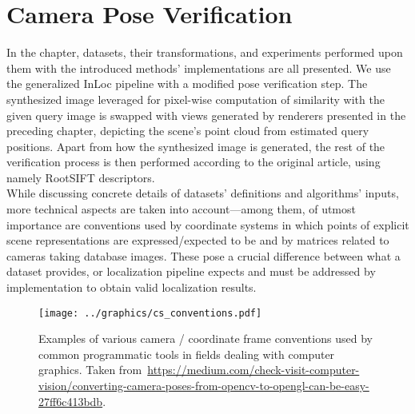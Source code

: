 \chapter{Camera Pose Verification}

In the chapter, datasets, their transformations, and experiments performed upon them with
the introduced methods' implementations are all presented. We use the generalized InLoc
pipeline with a modified pose verification step. The synthesized image leveraged for
pixel-wise computation of similarity with the given query image is swapped with views
generated by renderers presented in the preceding chapter, depicting the scene's point
cloud from estimated query positions. Apart from how the synthesized image is generated,
the rest of the verification process is then performed according to the original article,
using namely RootSIFT descriptors.\\

While discussing concrete details of datasets' definitions and algorithms' inputs, more
technical aspects are taken into account---among them, of utmost importance are
conventions used by coordinate systems in which points of explicit scene representations
are expressed/expected to be and by matrices related to cameras taking database images.
These pose a crucial difference between what a dataset provides, or localization pipeline
expects and must be addressed by implementation to obtain valid localization results.

\begin{figure}
    \centering
    \texttt{[image: ../graphics/cs\_conventions.pdf]}
    \caption{Examples of various camera / coordinate frame conventions used by
    common programmatic tools in fields dealing with computer graphics.
    Taken from~\url{https://medium.com/check-visit-computer-vision/converting-camera-poses-from-opencv-to-opengl-can-be-easy-27ff6c413bdb}.}\label{fig:cs_conventions}
\end{figure}

